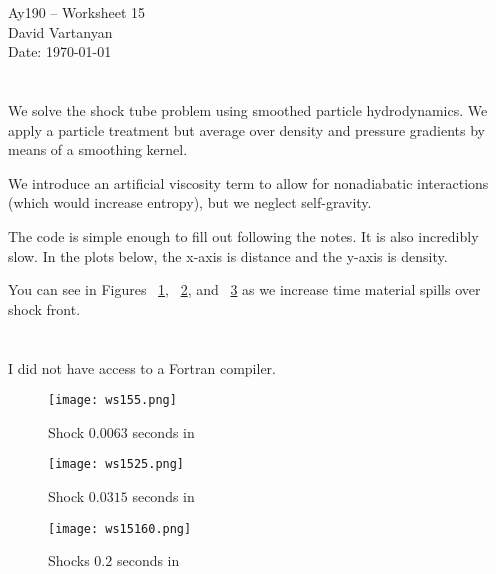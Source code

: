 \documentclass[11pt,letterpaper]{article}
\begin{document}
\begin{center}
\Large
Ay190 -- Worksheet 15\\
David Vartanyan\\
Date: \today
\end{center}

\section{}

We solve the shock tube problem using smoothed particle hydrodynamics. We apply a particle treatment but average over density and pressure gradients by means of a smoothing kernel.

We introduce an artificial viscosity term to allow for nonadiabatic interactions (which would increase entropy), but we neglect self-gravity. 

The code is simple enough to fill out following the notes. It is also incredibly slow. In the plots below, the x-axis is distance and the y-axis is density.

You can see in Figures ~\ref{fig:1}, ~\ref{fig:2}, and ~\ref{fig:3} as we increase time material spills over shock front.

\section{}
 I did not have access to a Fortran compiler. 

\begin{figure}[bth]
\centering
\texttt{[image: ws155.png]}
\caption{Shock $0.0063$ seconds in}
\label{fig:1}
\end{figure}

\begin{figure}[bth]
\centering
\texttt{[image: ws1525.png]}
\caption{Shock $0.0315$ seconds in}
\label{fig:2}
\end{figure}

\begin{figure}[bth]
\centering
\texttt{[image: ws15160.png]}
\caption{Shocks $0.2$ seconds in}
\label{fig:3}
\end{figure}
\end{document}
